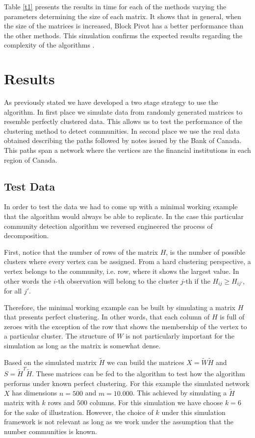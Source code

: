 \documentclass[11pt,letter]{article}%
\numberwithin{equation}{section}
\begin{document}
Table \ref{t1} presents the results in time for each of the methods varying the parameters determining the size of each matrix. It shows that in general, when the size of the matrices is increased, Block Pivot has a better performance than the other methods. This simulation confirms the expected results regarding the complexity of the algorithms \citep{kim2008}.  

\section{Results}

As previously stated we have developed a two stage strategy to use the algorithm. In first place we simulate data from randomly generated matrices to resemble perfectly clustered data. This allows us to test the performance of the clustering method to detect communities. In second place we use the real data obtained describing the paths followed by notes issued by the Bank of Canada. This paths span a network where the vertices are the financial institutions in each region of Canada.

\subsection{Test  Data}

In order to test the data we had to come up with a minimal working example that the algorithm would always be able to replicate. In the case this particular  community detection algorithm we reversed engineered the process of decomposition. 

First, notice that the number of rows of the matrix $H$, is the number of possible clusters where every vertex can be assigned. From a hard clustering perspective, a vertex belongs to the community, i.e. row, where it shows the largest value. In other words the $i$-th observation will belong to the cluster $j$-th if the $H_{ij}\geq H_{ij'}$, for all $j'$. 

Therefore, the minimal working example can be built by simulating a matrix $H$ that presents perfect clustering. In other words, that each column of  $H$ is full of zeroes with the exception of the row that shows the membership of the vertex to a particular cluster. The structure of $W$ is not particularly important for the simulation as long as the matrix is somewhat dense. 

Based on the simulated matrix $\widetilde{H}$ we can build the matrices $X=\widetilde{W}\widetilde{H}$ and  $S=\widetilde{H}^T\widetilde{H}$. These matrices can be fed to the algorithm to test how the algorithm performs under known perfect clustering. For this example the simulated network $X$ has dimensions $n=500$ and $m=10.000$. This achieved by simulating a $\widetilde{H}$ matrix with $k$ rows and $500$ columns.  For this simulation we have choose $k=6$ for the sake of illustration. However, the choice of $k$ under this simulation framework is not relevant as long as we work under the assumption that the number communities is known. 
\end{document}
